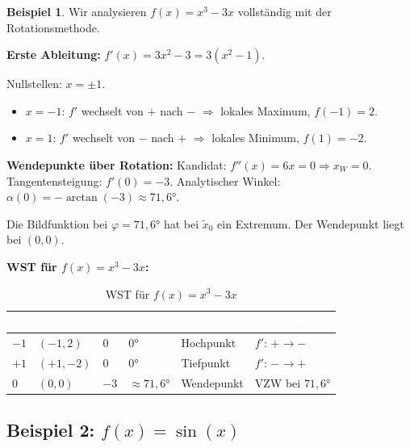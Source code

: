 ﻿\documentclass[12pt, a4paper]{article}
\theoremstyle{definition}
\newtheorem{beispiel}{Beispiel}[section]
\begin{document}
	\begin{beispiel}
		Wir analysieren $f(x) = x^3 - 3x$ vollständig mit der Rotationsmethode.
		
		\textbf{Erste Ableitung:}
		$f'(x) = 3x^2 - 3 = 3(x^2 - 1)$.
		
		Nullstellen: $x = \pm 1$.
		\begin{itemize}
			\item $x = -1$: $f'$ wechselt von $+$ nach $-$ $\Rightarrow$ lokales Maximum, $f(-1) = 2$.
			\item $x = 1$: $f'$ wechselt von $-$ nach $+$ $\Rightarrow$ lokales Minimum, $f(1) = -2$.
		\end{itemize}
		
		\textbf{Wendepunkte über Rotation:}
		Kandidat: $f''(x) = 6x = 0 \Rightarrow x_W = 0$. Tangentensteigung: $f'(0) = -3$.
		Analytischer Winkel: $\alpha(0) = -\arctan(-3) \approx 71{,}6 °$.
		
		Die Bildfunktion bei $\varphi = 71{,}6 °$ hat bei $\tilde{x}_0$ ein Extremum.
		Der Wendepunkt liegt bei $(0, 0)$.
		
		\textbf{WST für $f(x) = x^3 - 3x$:}
		
		\begin{table}[H]
			\centering
			\renewcommand{\arraystretch}{1.4}
			\begin{tabular}{C{1.3cm} C{2.3cm} C{2.0cm} C{2.2cm} C{2.4cm} L{2.5cm}}
				\toprule
				\textcolor{white}{\textbf{$x_i$}} & \textcolor{white}{\textbf{Punkt}} &
				\textcolor{white}{\textbf{$m_i$}} & \textcolor{white}{\textbf{$\alpha_i$}} &
				\textcolor{white}{\textbf{Typ}} & \textcolor{white}{\textbf{Nachweis}} \\
				\midrule
				 $-1$ & $(-1, 2)$ & $0$ & $0 °$ & Hochpunkt & $f'$: $+\to-$ \\
				 $+1$ & $(+1,-2)$ & $0$ & $0 °$ & Tiefpunkt & $f'$: $-\to+$ \\
				 $0$ & $(0, 0)$ & $-3$ & $\approx 71{,}6 °$ & Wendepunkt & VZW bei $71{,}6 °$ \\
				\bottomrule
			\end{tabular}
			\caption{WST für $f(x) = x^3 - 3x$}
		\end{table}
	\end{beispiel}
	
	\subsection{Beispiel 2: $f(x) = \sin(x)$}
	
\end{document}
